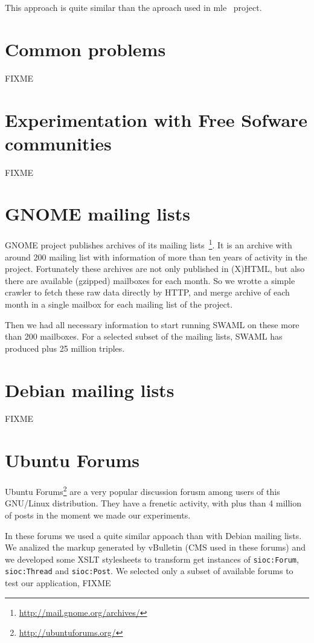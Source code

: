 \documentclass{../templates/www2008-submission}
\begin{document}
This approach is quite similar than the aproach used in mle~\cite{Hausenblas2007}
project.


\section{Common problems}

FIXME

\section{Experimentation with Free Sofware communities}

FIXME

\section{\label{sec:gnome}GNOME mailing lists}

GNOME project publishes archives of its mailing lists~\footnote{\url{http://mail.gnome.org/archives/}}.
It is an archive with around 200 mailing list with information of 
more than ten years of activity in the project. Fortunately these
archives are not only published in (X)HTML, but also there are 
available (gzipped) mailboxes for each month. So we wrotte a simple
crawler to fetch these raw data directly by HTTP, and merge archive
of each month in a single mailbox for each mailing list of the project.

Then we had all necessary information to start running SWAML on these 
more than 200 mailboxes. For a selected subset of the mailing lists, 
SWAML has produced plus 25 million triples.

\section{Debian mailing lists}

FIXME

\section{Ubuntu Forums}

Ubuntu Forums\footnote{\url{http://ubuntuforums.org/}} are a very popular 
discussion forusm among users of this GNU/Linux distribution. They have a 
frenetic activity, with plus than 4 million of posts in the moment we made
our experiments.

In these forums we used a quite similar appoach than with Debian mailing
lists. We analized the markup generated by vBulletin (CMS used in these forums)
and we developed some XSLT stylesheets to transform get instances of
\texttt{sioc:Forum}, \texttt{sioc:Thread} and \texttt{sioc:Post}. We 
selected only a subset of available forums to test our application, FIXME
\end{document}
